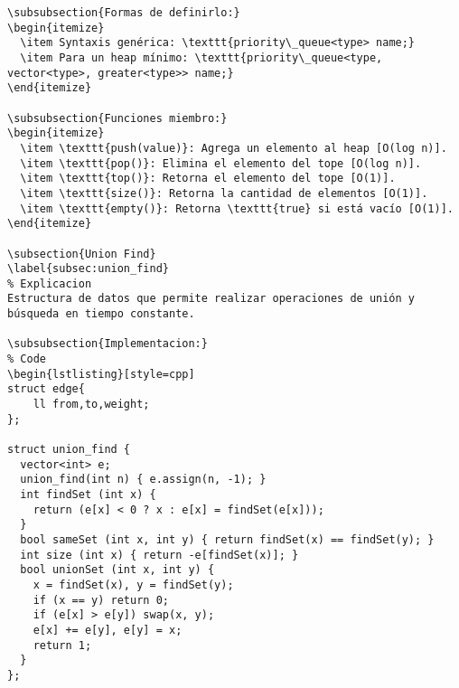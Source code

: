 \begin{lstlisting}[style=cpp]
\subsubsection{Formas de definirlo:}
\begin{itemize}
  \item Syntaxis genérica: \texttt{priority\_queue<type> name;}
  \item Para un heap mínimo: \texttt{priority\_queue<type, vector<type>, greater<type>> name;}
\end{itemize}

\subsubsection{Funciones miembro:}
\begin{itemize}
  \item \texttt{push(value)}: Agrega un elemento al heap [O(log n)].
  \item \texttt{pop()}: Elimina el elemento del tope [O(log n)].
  \item \texttt{top()}: Retorna el elemento del tope [O(1)].
  \item \texttt{size()}: Retorna la cantidad de elementos [O(1)].
  \item \texttt{empty()}: Retorna \texttt{true} si está vacío [O(1)]. 
\end{itemize}

\subsection{Union Find}
\label{subsec:union_find}
% Explicacion
Estructura de datos que permite realizar operaciones de unión y búsqueda en tiempo constante. 

\subsubsection{Implementacion:}
% Code
\begin{lstlisting}[style=cpp]
struct edge{
    ll from,to,weight;
};

struct union_find {
  vector<int> e;
  union_find(int n) { e.assign(n, -1); }
  int findSet (int x) { 
    return (e[x] < 0 ? x : e[x] = findSet(e[x]));
  }
  bool sameSet (int x, int y) { return findSet(x) == findSet(y); }
  int size (int x) { return -e[findSet(x)]; }
  bool unionSet (int x, int y) {
    x = findSet(x), y = findSet(y);
    if (x == y) return 0;
    if (e[x] > e[y]) swap(x, y);
    e[x] += e[y], e[y] = x;
    return 1;
  }
};
\end{lstlisting}

